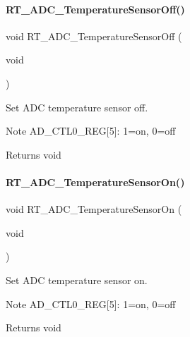 \paragraph{\texorpdfstring{R\+T\+\_\+\+A\+D\+C\+\_\+\+Temperature\+Sensor\+Off()}{RT\_ADC\_TemperatureSensorOff()}}
{\footnotesize\ttfamily void R\+T\+\_\+\+A\+D\+C\+\_\+\+Temperature\+Sensor\+Off (\begin{DoxyParamCaption}\item[{void}]{ }\end{DoxyParamCaption})\hspace{0.3cm}{\ttfamily [inline]}}



Set A\+DC temperature sensor off. 

\begin{DoxyNote}{Note}
A\+D\+\_\+\+C\+T\+L0\+\_\+\+R\+EG\mbox{[}5\mbox{]}\+: 1=on, 0=off 
\end{DoxyNote}
\begin{DoxyReturn}{Returns}
void 
\end{DoxyReturn}
\mbox{\label{a00002_afd0ecdb5dcb37d2a26bd85fb060ee15b}} 
\paragraph{\texorpdfstring{R\+T\+\_\+\+A\+D\+C\+\_\+\+Temperature\+Sensor\+On()}{RT\_ADC\_TemperatureSensorOn()}}
{\footnotesize\ttfamily void R\+T\+\_\+\+A\+D\+C\+\_\+\+Temperature\+Sensor\+On (\begin{DoxyParamCaption}\item[{void}]{ }\end{DoxyParamCaption})\hspace{0.3cm}{\ttfamily [inline]}}



Set A\+DC temperature sensor on. 

\begin{DoxyNote}{Note}
A\+D\+\_\+\+C\+T\+L0\+\_\+\+R\+EG\mbox{[}5\mbox{]}\+: 1=on, 0=off 
\end{DoxyNote}
\begin{DoxyReturn}{Returns}
void 
\end{DoxyReturn}
\mbox{\label{a00002_afa1d06c9b0f775905f17e2395cd0ce6f}} 
